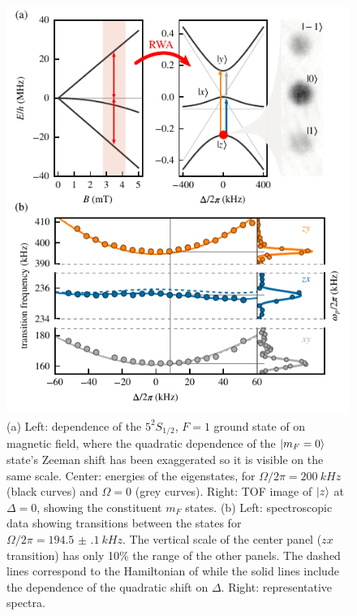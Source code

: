 \begin{figure}[t]
    \centering
    \includegraphics[]{Figures/Chapter6/fig1.pdf}
    \caption{(a) Left: dependence of the $5^2S_{1/2}$, $F=1$ ground state of \rb on magnetic field, where the quadratic dependence of the $\vert m_F=0\rangle$ state's Zeeman shift has been exaggerated so it is visible on the same scale.
    Center: energies of the \xyz eigenstates, for $\Omega/2\pi=\SI{200}{kHz}$ (black curves) and $\Omega=0$ (grey curves).
    Right: TOF image of $\vert z\rangle$ at $\Delta=0$, showing the constituent $m_F$ states.
    (b) Left: spectroscopic data showing transitions between the \xyz states for $\Omega/2\pi = \SI{194.5(1)}{kHz}$.
    The vertical scale of the center panel ($zx$ transition) has only 10\% the range of the other panels.
    The dashed lines correspond to the Hamiltonian of 
   while the solid lines include the dependence of the quadratic shift on $\Delta$.
    Right: representative spectra.}
    \label{fig:1}
\end{figure}

